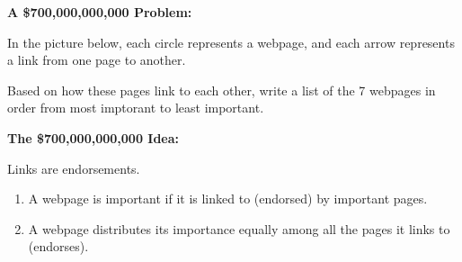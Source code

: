 
\begin{applicationActivities}

\begin{activity}{10}

\textbf{A \$700,000,000,000 Problem:}

\vspace{1em}

In the picture below, each circle represents a webpage, and each arrow
represents a link from one page to another.

\begin{center}
\end{center}

Based on how these pages link to each other,
write a list of the 7 webpages in order from
most imptorant to least important.
\end{activity}

\begin{observation}
\textbf{The \$700,000,000,000 Idea:} \\

\vspace{1em}

Links are endorsements.

\begin{enumerate}
\item
A webpage is important if it is linked to (endorsed) by important pages.

\item
A webpage distributes its importance equally among all the pages it links to
(endorses).
\end{enumerate}
\end{observation}


\end{applicationActivities}

